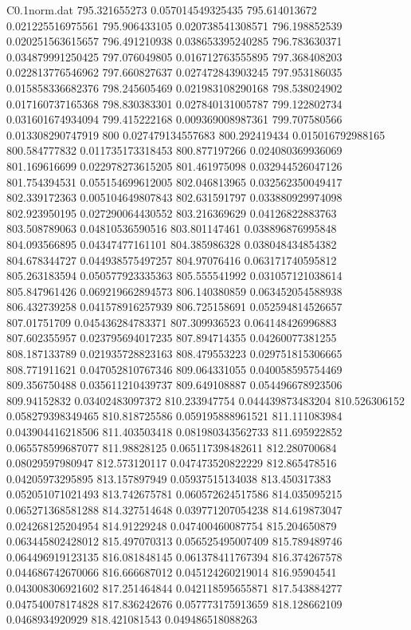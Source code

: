 \begin{filecontents}{C0.1norm.dat}
795.321655273		0.057014549325435
795.614013672		0.021225516975561
795.906433105		0.020738541308571
796.198852539		0.020251563615657
796.491210938		0.038653395240285
796.783630371		0.034879991250425
797.076049805		0.016712763555895
797.368408203		0.022813776546962
797.660827637		0.027472843903245
797.953186035		0.015858336682376
798.245605469		0.021983108290168
798.538024902		0.017160737165368
798.830383301		0.027840131005787
799.122802734		0.031601674934094
799.415222168		0.009369008987361
799.707580566		0.013308290747919
800		0.027479134557683
800.292419434		0.015016792988165
800.584777832		0.011735173318453
800.877197266		0.024080369936069
801.169616699		0.022978273615205
801.461975098		0.032944526047126
801.754394531		0.055154699612005
802.046813965		0.032562350049417
802.339172363		0.005104649807843
802.631591797		0.033880929974098
802.923950195		0.027290064430552
803.216369629		0.04126822883763
803.508789063		0.04810536590516
803.801147461		0.038896876995848
804.093566895		0.04347477161101
804.385986328		0.038048434854382
804.678344727		0.044938575497257
804.97076416		0.063171740595812
805.263183594		0.050577923335363
805.555541992		0.031057121038614
805.847961426		0.069219662894573
806.140380859		0.063452054588938
806.432739258		0.041578916257939
806.725158691		0.052594814526657
807.01751709		0.045436284783371
807.309936523		0.064148426996883
807.602355957		0.023795694017235
807.894714355		0.04260077381255
808.187133789		0.021935728823163
808.479553223		0.029751815306665
808.771911621		0.047052810767346
809.064331055		0.040058595754469
809.356750488		0.035611210439737
809.649108887		0.054496678923506
809.94152832		0.03402483097372
810.233947754		0.044439873483204
810.526306152		0.058279398349465
810.818725586		0.059195888961521
811.111083984		0.043904416218506
811.403503418		0.081980343562733
811.695922852		0.065578599687077
811.98828125		0.065117398482611
812.280700684		0.08029597980947
812.573120117		0.047473520822229
812.865478516		0.04205973295895
813.157897949		0.05937515134038
813.450317383		0.052051071021493
813.742675781		0.060572624517586
814.035095215		0.065271368581288
814.327514648		0.039771207054238
814.619873047		0.024268125204954
814.91229248		0.047400460087754
815.204650879		0.063445802428012
815.497070313		0.056525495007409
815.789489746		0.064496919123135
816.081848145		0.061378411767394
816.374267578		0.044686742670066
816.666687012		0.045124260219014
816.95904541		0.043008306921602
817.251464844		0.042118595655871
817.543884277		0.047540078174828
817.836242676		0.057773175913659
818.128662109		0.0468934920929
818.421081543		0.049486518088263

\end{filecontents}

